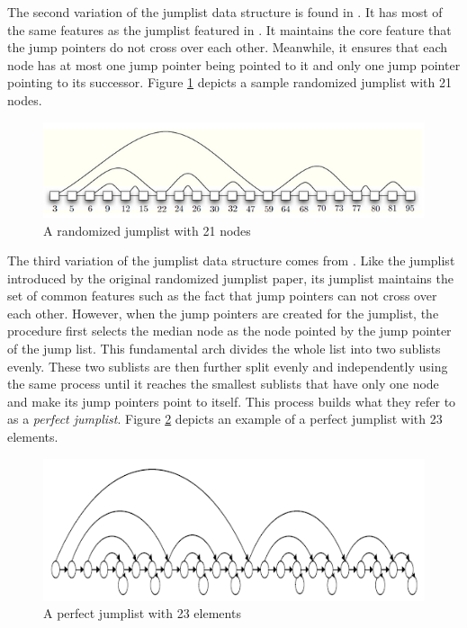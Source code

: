 \documentclass[oribibl]{llncs}
\begin{document}
The second variation of the jumplist data structure is found in \cite{skip_lift}. It has most of the same features as the jumplist featured in \cite{jump_list}. It maintains the core feature that the jump pointers do not cross over each other. Meanwhile, it ensures that each node has at most one jump pointer being pointed to it and only one jump pointer pointing to its successor. Figure \ref{fig:jumplist} depicts a sample randomized jumplist with 21 nodes.


\begin{figure}[here]
\center
\includegraphics[width=15cm]{images/jumplist}
\caption{A randomized jumplist with 21 nodes}
\label{fig:jumplist}
\end{figure}


The third variation of the jumplist data structure comes from \cite{ElmasryMarch2005}. Like the jumplist introduced by the original randomized jumplist paper, its jumplist maintains the set of common features such as the fact that jump pointers can not cross over each other. However, when the jump pointers are created for the jumplist, the procedure first selects the median node as the node pointed by the jump pointer of the jump list. This fundamental arch divides the whole list into two sublists evenly. These two sublists are then further split evenly and independently using the same process until it reaches the smallest sublists that have only one node and make its jump pointers point to itself. This process builds what they refer to as a {\it perfect jumplist}. Figure \ref{fig:jumplist1} depicts an example of a perfect jumplist with 23 elements.


\begin{figure}[here]
\center
\includegraphics[width=12cm]{images/perfect_jumplist}
\caption{A perfect jumplist with 23 elements}
\label{fig:jumplist1}
\end{figure}
\end{document}
